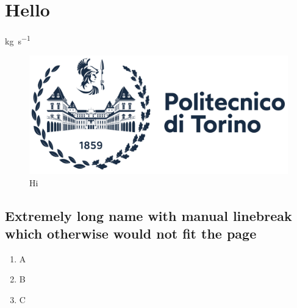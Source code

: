 \chapter{Hello}
\label{sec:hello}

\cite[Hi][Goofy]{IEEEexample:article_typical}

\si{\kilo\gram\per\second}

\begin{figure}[htbp]
\centering
\includegraphics[width=.9\linewidth]{images/logo/polito_logo_2021_blu.jpg}
\caption{Hi}
\label{fig:hi}
\end{figure}

\section[Extremely long name with manual linebreak which otherwise would not fit the page]{Extremely long name with manual linebreak\\which otherwise would not fit the page} %

\begin{enumerate}
    \item A
    \item B
    \item C
\end{enumerate}

